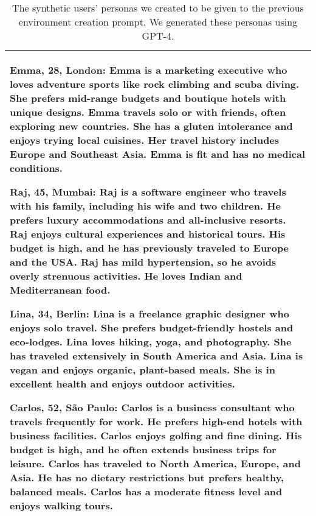 \begin{table*}[!ht]
    \centering
    \begin{tabular}{p{}}
    \toprule
    \toprule
    Emma, 28, London: Emma is a marketing executive who loves adventure sports like rock climbing and scuba diving. She prefers mid-range budgets and boutique hotels with unique designs. Emma travels solo or with friends, often exploring new countries. She has a gluten intolerance and enjoys trying local cuisines. Her travel history includes Europe and Southeast Asia. Emma is fit and has no medical conditions. \newline
    
Raj, 45, Mumbai: Raj is a software engineer who travels with his family, including his wife and two children. He prefers luxury accommodations and all-inclusive resorts. Raj enjoys cultural experiences and historical tours. His budget is high, and he has previously traveled to Europe and the USA. Raj has mild hypertension, so he avoids overly strenuous activities. He loves Indian and Mediterranean food. \newline

Lina, 34, Berlin: Lina is a freelance graphic designer who enjoys solo travel. She prefers budget-friendly hostels and eco-lodges. Lina loves hiking, yoga, and photography. She has traveled extensively in South America and Asia. Lina is vegan and enjoys organic, plant-based meals. She is in excellent health and enjoys outdoor activities. \newline

Carlos, 52, São Paulo: Carlos is a business consultant who travels frequently for work. He prefers high-end hotels with business facilities. Carlos enjoys golfing and fine dining. His budget is high, and he often extends business trips for leisure. Carlos has traveled to North America, Europe, and Asia. He has no dietary restrictions but prefers healthy, balanced meals. Carlos has a moderate fitness level and enjoys walking tours. \newline   \\
    \bottomrule
    \bottomrule         
    \end{tabular}
    \caption{The synthetic users' personas we created to be given to the previous environment creation prompt. We generated these personas using GPT-4.}
    \label{tab:create_synthetic_personas}
\end{table*}

